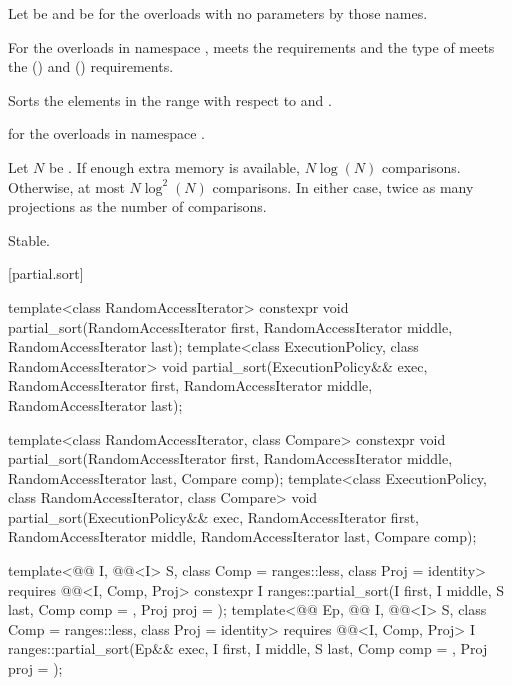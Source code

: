 \begin{itemdescr}
\pnum
Let  be 
and  be 
for the overloads with no parameters by those names.

\pnum
\expects
For the overloads in namespace ,
 meets
the  requirements and
the type of  meets
the  () and
 () requirements.

\pnum
\effects
Sorts the elements in the range 
with respect to  and .

\pnum
\returns
{} for the overloads in namespace .

\pnum
\complexity
Let $N$ be .
If enough extra memory is available, $N \log(N)$ comparisons.
Otherwise, at most $N \log^2(N)$ comparisons.
In either case, twice as many projections as the number of comparisons.

\pnum
\remarks
Stable.
\end{itemdescr}

[partial.sort]{}

%
\begin{itemdecl}
template<class RandomAccessIterator>
  constexpr void partial_sort(RandomAccessIterator first,
                              RandomAccessIterator middle,
                              RandomAccessIterator last);
template<class ExecutionPolicy, class RandomAccessIterator>
  void partial_sort(ExecutionPolicy&& exec,
                    RandomAccessIterator first,
                    RandomAccessIterator middle,
                    RandomAccessIterator last);

template<class RandomAccessIterator, class Compare>
  constexpr void partial_sort(RandomAccessIterator first,
                              RandomAccessIterator middle,
                              RandomAccessIterator last,
                              Compare comp);
template<class ExecutionPolicy, class RandomAccessIterator, class Compare>
  void partial_sort(ExecutionPolicy&& exec,
                    RandomAccessIterator first,
                    RandomAccessIterator middle,
                    RandomAccessIterator last,
                    Compare comp);

template<@@ I, @@<I> S, class Comp = ranges::less,
         class Proj = identity>
  requires @@<I, Comp, Proj>
  constexpr I
    ranges::partial_sort(I first, I middle, S last, Comp comp = {}, Proj proj = {});
template<@@ Ep, @@ I, @@<I> S,
         class Comp = ranges::less, class Proj = identity>
  requires @@<I, Comp, Proj>
  I ranges::partial_sort(Ep&& exec, I first, I middle, S last, Comp comp = {}, Proj proj = {});
\end{itemdecl}

